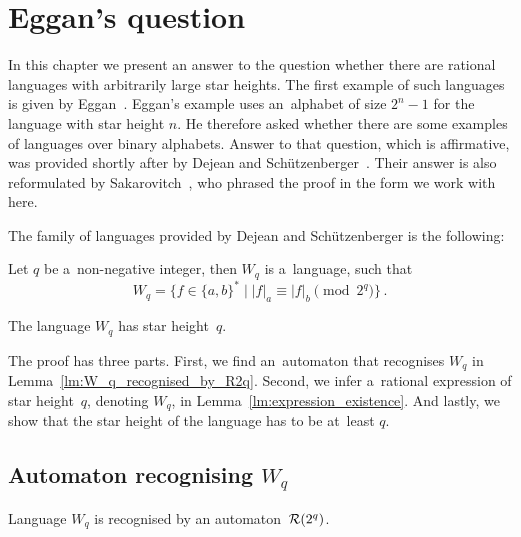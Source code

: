 \chapter{Eggan's question}

In this chapter we present an answer to the question whether there are rational languages with arbitrarily large star heights. The first example of such languages is given by Eggan~\cite{Eggan63}. Eggan's example uses an~alphabet of size $2^n - 1$ for the language with star height $n$. He therefore asked whether there are some examples of languages over binary alphabets. Answer to that question, which is affirmative, was provided shortly after by Dejean and Schützenberger~\cite{DejeanSchutzenberger66}. Their answer is also reformulated by Sakarovitch~\cite{Sakarovitch09}, who phrased the proof in the form we work with here.

The family of languages provided by Dejean and Schützenberger is the following:

\begin{defn}
    Let $q$ be a~non-negative integer, then $W_q$ is a~language, such that
    \[
        W_q = \{ f \in {\{a, b\}}^* \mid |f|_a \equiv |f|_b \pmod{2^q} \} \, .
    \]
\end{defn}

\begin{thm}\label{thm:main}
    The language $W_q$ has star height~$q$.
\end{thm}

The proof has three parts. First, we find an~automaton that recognises $W_q$ in Lemma~\ref*{lm:W_q_recognised_by_R2q}. Second, we infer a~rational expression of star height~$q$, denoting $W_q$, in Lemma~\ref*{lm:expression_existence}. And lastly, we show that the star height of the language has to be at~least $q$.

\section{Automaton recognising $W_q$}\label{section:automaton_recognising_W_q}

\begin{lemma}\label{lm:W_q_recognised_by_R2q}
    Language $W_q$ is recognised by an automaton~${\mathcal{R}}(2^q)$.
\end{lemma}

